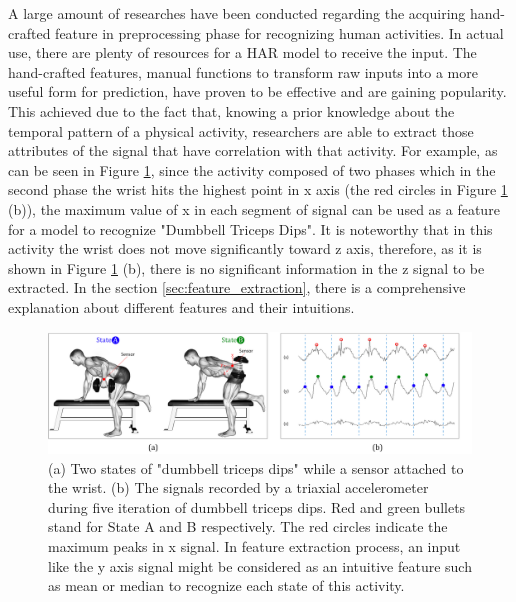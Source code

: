 \documentclass[journal,article,submit,moreauthors,pdftex]{Definitions/mdpi}
\begin{document}
A large amount of researches have been conducted regarding the acquiring hand-crafted feature in preprocessing phase for recognizing human activities. In actual use, there are plenty of resources for a HAR model to receive the input. The hand-crafted features, manual functions to transform raw inputs into a more useful form for prediction, have proven to be effective and are gaining popularity\cite{wang2019survey}. This achieved due to the fact that, knowing a prior knowledge about the temporal pattern of a physical activity, researchers are able to extract those attributes of the signal that have correlation with that activity. For example, as can be seen in Figure \ref{fig:feature_intuition}, since the activity composed of two phases which in the second phase the wrist hits the highest point in x axis (the red circles in Figure \ref{fig:feature_intuition} (b)), the maximum value of x in each segment of signal can be used as a feature for a model to recognize "Dumbbell Triceps Dips". It is noteworthy that in this activity the wrist does not move significantly toward z axis, therefore, as it is shown in Figure \ref{fig:feature_intuition} (b), there is no significant information in the z signal to be extracted. In the section \ref{sec:feature_extraction}, there is a comprehensive explanation about different features and their intuitions.

\begin{figure}[H]
	\centering
	\includegraphics[width=14 cm]{Definitions/images/hand_craft_intuition.jpg}
	\caption{(a) Two states of "dumbbell triceps dips" while a sensor attached to the wrist. (b) The signals recorded by a triaxial accelerometer during five iteration of dumbbell triceps dips. Red and green bullets stand for State A and B respectively. The red circles indicate the maximum peaks in x signal. In feature extraction process, an input like the y axis signal might be considered as an intuitive feature such as mean or median to recognize each state of this activity.}
	\label{fig:feature_intuition}
\end{figure} 
\end{document}
